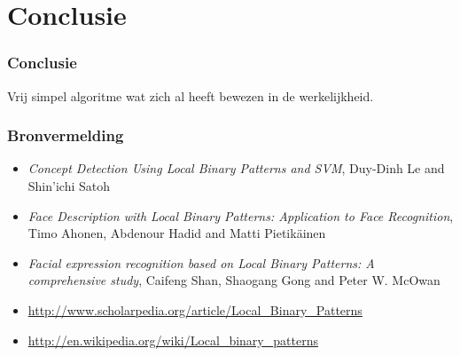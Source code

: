 \documentclass{beamer}
\begin{document}
	\section{Conclusie}
	
	\begin{frame}
    \frametitle{Conclusie}
    Vrij simpel algoritme wat zich al heeft bewezen in de werkelijkheid.
  \end{frame}
		
  \begin{frame}
    \frametitle{Bronvermelding}
    \begin{itemize}
      \item \emph{Concept Detection Using Local Binary Patterns and SVM}, Duy-Dinh Le and Shin’ichi Satoh
      \item \emph{Face Description with Local Binary Patterns: Application to Face Recognition}, Timo Ahonen, 	
        Abdenour Hadid and Matti Pietik\"ainen
      \item \emph{Facial expression recognition based on Local Binary Patterns: A comprehensive study}, Caifeng 
        Shan, Shaogang Gong and Peter W. McOwan
      \item \url{http://www.scholarpedia.org/article/Local_Binary_Patterns}
      \item \url{http://en.wikipedia.org/wiki/Local_binary_patterns}
    \end{itemize}
  \end{frame}
	
\end{document}
